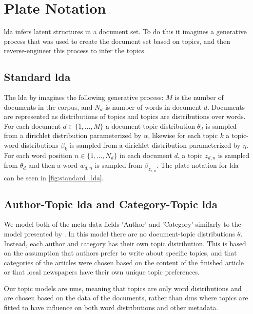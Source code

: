 \section{Plate Notation}
\Gls{lda} infers latent structures in a document set. To do this it imagines a generative process that was used to create the document set based on topics, and then reverse-engineer this process to infer the topics.

\subsection{Standard \gls{lda}}
The \gls{lda} by \citet{blei2003latent} imagines the following generative process:
$M$ is the number of documents in the corpus, and $N_d$ is number of words in document $d$.
Documents are represented as distributions of topics and topics are distributions over words.
For each document $d \in \{1,\dots, M\}$ a document-topic distribution $\theta_d$ is sampled from a dirichlet distribution parameterized by $\alpha$, likewise for each topic $k$ a topic-word distributions $\beta_k$ is sampled from a dirichlet distribution parameterized by $\eta$.
For each word position $n \in \{1, \dots, N_d\}$ in each document $d$, a topic $z_{d,n}$ is sampled from $\theta_d$ and then a word $w_{d,n}$ is sampled from $\beta_{z_{d,n}}$.
The plate notation for \gls{lda} can be seen in \autoref{fig:standard_lda}.



\subsection{Author-Topic \gls{lda} and Category-Topic \gls{lda}}
We model both of the meta-data fields 'Author' and 'Category' similarly to the model presented by \citet{author_topic_2012}.
In this model there are no document-topic distributions $\theta$.
Instead, each author and category has their own topic distribution.
This is based on the assumption that authors prefer to write about specific topics, and that categories of the articles were chosen based on the content of the finished article or that local newspapers have their own unique topic preferences.

Our topic models are \glspl{um}, meaning that topics are only word distributions and are chosen based on the data of the documents, rather than \glspl{dm} where topics are fitted to have influence on both word distributions and other metadata.

